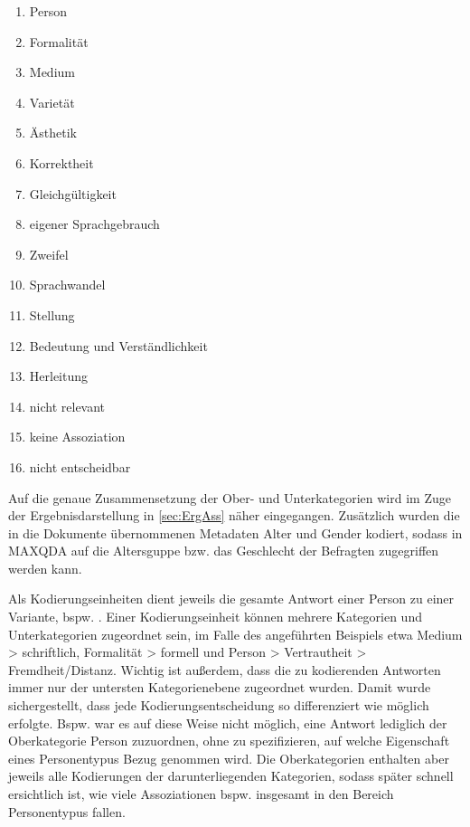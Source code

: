 \newpage \begin{enumerate}
\item Person
\item Formalität
\item Medium 
\item Varietät 
\item Ästhetik
\item Korrektheit 
\item Gleichgültigkeit 
\item eigener Sprachgebrauch
\item Zweifel
\item Sprachwandel 
\item Stellung 
\item Bedeutung und Verständlichkeit 
\item Herleitung 
\item nicht relevant 
\item keine Assoziation
\item nicht entscheidbar 
\end{enumerate}
Auf die genaue Zusammensetzung der Ober- und Unterkategorien wird im Zuge der Ergebnisdarstellung in \autoref{sec:ErgAss} näher eingegangen. 
Zusätzlich wurden die in die Dokumente übernommenen Metadaten Alter und Gender kodiert, sodass in MAXQDA auf die Altersguppe bzw. das Geschlecht der Befragten zugegriffen werden kann. 

Als Kodierungseinheiten dient jeweils die gesamte Antwort einer Person zu einer Variante,  bspw. . 
Einer Kodierungseinheit können mehrere Kategorien und Unterkategorien zugeordnet sein, im Falle des angeführten Beispiels  etwa \glqq Medium > schriftlich\grqq, \glqq Formalität > formell\grqq{} und \glqq Person > Vertrautheit > Fremdheit/Distanz\grqq.
Wichtig ist außerdem, dass die zu kodierenden Antworten immer nur der untersten Kategorienebene zugeordnet wurden. 
Damit wurde sichergestellt, dass jede Kodierungsentscheidung so differenziert wie möglich erfolgte.
Bspw. war es auf diese Weise nicht möglich, eine Antwort lediglich der Oberkategorie \glqq Person\grqq{} zuzuordnen, ohne zu spezifizieren, auf welche Eigenschaft eines Personentypus Bezug genommen wird. 
Die Oberkategorien enthalten aber jeweils alle Kodierungen der darunterliegenden Kategorien, sodass später schnell ersichtlich ist, wie viele Assoziationen bspw. insgesamt in den Bereich Personentypus fallen.

